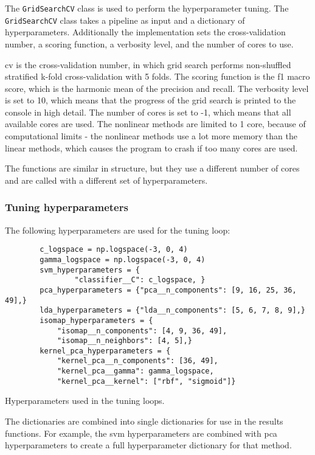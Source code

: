 The \texttt{GridSearchCV} class is used to perform the hyperparameter tuning. The \texttt{GridSearchCV} class takes a pipeline as input and a dictionary of hyperparameters. Additionally the implementation sets the cross-validation number, a scoring function, a verbosity level, and the number of cores to use.

cv is the cross-validation number, in which grid search performs non-shuffled stratified k-fold cross-validation with 5 folds. The scoring function is the f1 macro score, which is the harmonic mean of the precision and recall. The verbosity level is set to 10, which means that the progress of the grid search is printed to the console in high detail. The number of cores is set to -1, which means that all available cores are used. The nonlinear methods are limited to 1 core, because of computational limits - the nonlinear methods use a lot more memory than the linear methods, which causes the program to crash if too many cores are used.


The functions are similar in structure, but they use a different number of cores and are called with a different set of hyperparameters.

\subsubsection{Tuning hyperparameters}\label{subsubsec:the-hyperparameters}
The following hyperparameters are used for the tuning loop:


\begin{listing}[htb!]
    \centering
    \begin{verbatim}
        c_logspace = np.logspace(-3, 0, 4)
        gamma_logspace = np.logspace(-3, 0, 4)
        svm_hyperparameters = {
                "classifier__C": c_logspace, }
        pca_hyperparameters = {"pca__n_components": [9, 16, 25, 36, 49],}
        lda_hyperparameters = {"lda__n_components": [5, 6, 7, 8, 9],}
        isomap_hyperparameters = {
            "isomap__n_components": [4, 9, 36, 49],
            "isomap__n_neighbors": [4, 5],}
        kernel_pca_hyperparameters = {
            "kernel_pca__n_components": [36, 49],
            "kernel_pca__gamma": gamma_logspace,
            "kernel_pca__kernel": ["rbf", "sigmoid"]}
    \end{verbatim}
    \caption{Hyperparameters used in the tuning loops.}
    \label{lst:hyperparameters-dictionaries}
\end{listing}


The dictionaries are combined into single dictionaries for use in the results functions. For example, the \gls{svm} hyperparameters are combined with \gls{pca} hyperparameters to create a full hyperparameter dictionary for that method.

